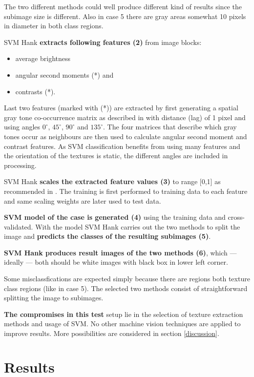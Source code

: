 \documentclass[11pt,twocolumn]{article}
\begin{document}
The two different methods could well produce different kind of
results
since the subimage size is different.
Also in case 5 there are gray areas somewhat 10 pixels in diameter
in both class regions.

SVM Hank \textbf{extracts following features (2)} from image blocks:
\begin{itemize}
    \item average brightness
    \item angular second moments (*) and
    \item contrasts (*).
\end{itemize}

Last two features (marked with (*)) are extracted by first generating
a spatial gray tone co-occurrence matrix as described in \cite{haralick73}
with distance (lag) of 1 pixel and using angles
$0 ^{\circ}$, $45 ^{\circ}$, $90 ^{\circ}$ and $135 ^{\circ}$.
The four matrices that describe which gray tones occur as neighbours
are then used to calculate angular second moment and contrast features.
As SVM classification benefits from using many features and the orientation
of the textures is static,
the different angles are included in processing.

SVM Hank \textbf{scales the extracted feature values (3)}
to range [0,1] as recommended
in \cite{libsvm_guide}.
The training is first performed to training data to each feature
and same scaling weights are later used to test data.

\textbf{SVM model of the case is generated (4)} using the training data
and cross-validated.
With the model SVM Hank carries out the two methods to split the
image and \textbf{predicts the classes of the resulting subimages (5)}.

\textbf{SVM Hank produces result images of the two methods (6)},
which --- ideally --- both should be white images with black box in
lower left corner.

Some misclassfications are expected simply because there are regions
both texture class regions (like in case 5).
The selected two methods consist of straightforward splitting the image
to subimages.

\textbf{The compromises in this test} setup lie in the selection of texture
extraction methods and usage of SVM.
No other machine vision techniques are applied to improve results.
More possibilities are considered in section \ref{discussion}.

\section{Results}
\end{document}
